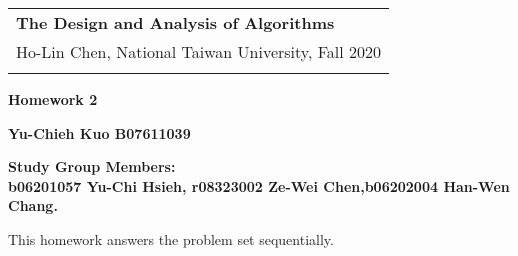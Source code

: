 \documentclass[a4paper,12pt]{article}
\begin{document}
\thispagestyle{plain} %

\begin{tabular}{p{15.5cm}} %
{\large \bf The Design and Analysis of Algorithms} \\
Ho-Lin Chen, National Taiwan University, Fall 2020  \\
\hline %
\\
\end{tabular} %

\vspace*{0.3cm} %

\begin{center} %
	{\Large \bf Homework 2} %
	\vspace{2mm}
	
	{\bf Yu-Chieh Kuo B07611039} %
		
\end{center}  
\begin{center}
\textbf{Study Group Members:} \\
\textbf{b06201057 Yu-Chi Hsieh, r08323002 Ze-Wei Chen,b06202004 Han-Wen Chang.}
\end{center}

\vspace{0.4cm}
This homework answers the problem set sequentially. 
\end{document}
